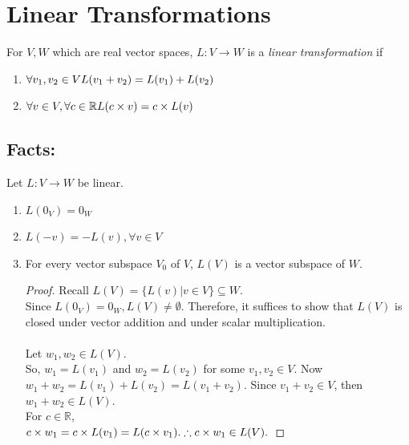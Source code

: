 \documentclass{article}
\theoremstyle{definition}
\newcommand{\reals}{\mathbb{R}}
\begin{document}
	\section{Linear Transformations}
	For $V, W$ which are real vector spaces, $L:V\rightarrow W$ is a \emph{linear transformation} if
	\begin{enumerate}[font=\sffamily\bfseries]
		\item $\forall v_1, v_2 \in V\\ L(v_1 + v_2) = L(v_1) + L(v_2)$
		\item $\forall v \in V, \forall c \in \reals\\ L(c\times v) = c \times L(v)$
	\end{enumerate}
	\subsection{Facts:}
	Let $L:V \rightarrow W$ be linear.
	\begin{enumerate}[font=\sffamily\bfseries]
		\item $L(0_V) = 0_W$
		\item $L(-v) = -L(v), \forall v \in V$
		\item For every vector subspace $V_0$ of $V$, $L(V)$ is a vector subspace of $W$.
		\begin{proof}
			Recall $L(V) = \{L(v) | v \in V\} \subseteq W$.\\
			Since $L(0_V) = 0_W, L(V) \neq \emptyset$. Therefore, it suffices to show that $L(V)$ is closed under vector addition and under scalar multiplication.\\\\
			Let $w_1, w_2 \in L(V)$.\\
			So, $w_1 = L(v_1)$ and $w_2 = L(v_2)$ for some $v_1, v_2 \in V$.
			Now $w_1 + w_2 = L(v_1) + L(v_2) = L(v_1 + v_2)$.
			Since $v_1 + v_2 \in V$, then $w_1 + w_2 \in L(V)$.\\
			For $c \in \reals$,\\
			$c \times w_1 = c \times L(v_1) = L(c \times v_1).\\
			\therefore c \times w_1 \in L(V).$
		\end{proof} 
	\end{enumerate}
\end{document}
